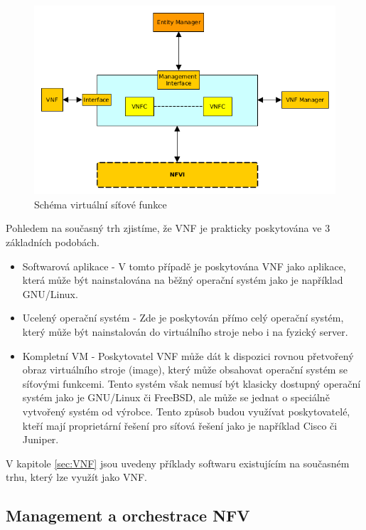 \begin{figure}[h]
\begin{centering}
\includegraphics[scale=0.67]{images/VNF}
\par\end{centering}
\caption{Schéma virtuální síťové funkce\label{fig:VNF}}
\end{figure}

Pohledem na současný trh zjistíme, že VNF je prakticky poskytována ve 3 základních podobách.

\begin{itemize}
\item Softwarová aplikace - V tomto případě je poskytována VNF jako aplikace, která může být nainstalována na běžný operační systém jako je například GNU/Linux.
\item Ucelený operační systém - Zde je poskytován přímo celý operační systém, který může být nainstalován do virtuálního stroje nebo i na fyzický server.
\item Kompletní VM - Poskytovatel VNF může dát k dispozici rovnou přetvořený obraz virtuálního stroje (image), který může obsahovat operační systém se síťovými funkcemi. Tento systém však nemusí být klasicky dostupný operační systém jako je GNU/Linux či FreeBSD, ale může se jednat o speciálně vytvořený systém od výrobce. Tento způsob budou využívat poskytovatelé, kteří mají proprietární řešení pro síťová řešení jako je například Cisco či Juniper.
\end{itemize}

V kapitole \ref{sec:VNF} jsou uvedeny příklady softwaru existujícím na současném trhu, který lze využít jako VNF.

\subsection{Management a orchestrace NFV}

